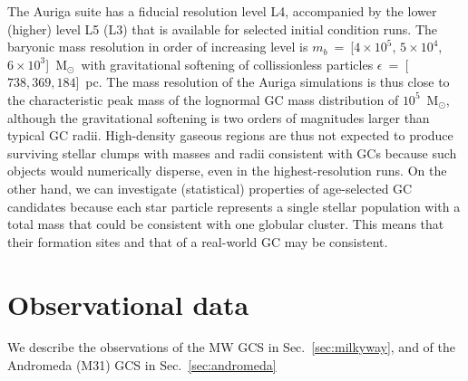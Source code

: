 \documentclass[a4paper,fleqn,usenatbib]{mnras}
\newcommand{\Sun}[0]{\ensuremath{_{\odot}}}
\begin{document}
The Auriga suite has a fiducial resolution level L4, accompanied by the lower
(higher) level L5 (L3) that is available for selected initial condition runs.
The baryonic mass resolution in order of increasing level is $m_b$~=~[$4 \times 10^5$,
$5 \times 10^4$, $6 \times 10^3$]~M\Sun \, with gravitational softening of
collissionless particles $\epsilon$~=~[$738, 369, 184$]~pc. The mass resolution
of the Auriga simulations is thus close to the characteristic peak mass of the
lognormal GC mass distribution of $10^{5}$~M\Sun \citep{1991ARA&A..29..543H},
although the gravitational softening is two orders of magnitudes larger than
typical GC radii. High-density gaseous regions are thus not expected to produce
surviving stellar clumps with masses and radii consistent with GCs because
such objects would numerically disperse, even in the highest-resolution runs.
On the other hand, we can investigate (statistical) properties of age-selected
GC candidates because each star particle represents a single stellar population
with a total mass that could be consistent with one globular cluster. This means
that their formation sites and that of a real-world GC may be consistent.



%


\section{Observational data}
\label{sec:observations}
We describe the observations of the MW GCS in Sec.~\ref{sec:milkyway},
and of the Andromeda (M31) GCS in Sec.~\ref{sec:andromeda}
\end{document}
